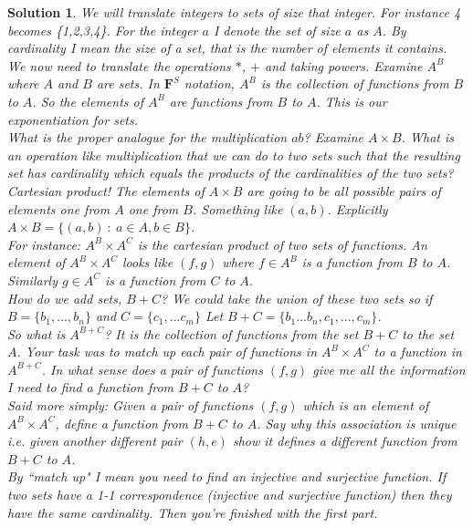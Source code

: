 \documentclass{article}
\theoremstyle{problemstyle}
\theoremstyle{problemstyle}
\newtheorem{solution}{Solution}
\theoremstyle{problemstyle}
\begin{document}
\begin{solution}
We will translate integers to sets of size that integer. For instance 4 becomes \{1,2,3,4\}. For the integer $a$ I denote the set of size $a$ as $A$. By cardinality I mean the size of a set, that is the number of elements it contains. \\ 

We now need to translate the operations $*$, $+$ and taking powers.  Examine $A^B$ where $A$ and $B$ are sets. In $\textbf{F}^S$ notation, $A^B$ is the collection of functions from $B$ to $A$. So the elements of $A^B$ are functions from $B$ to $A$. This is our exponentiation for sets.\\

What is the proper analogue for the multiplication $ab$? Examine $A\times B$. What is an operation like multiplication that we can do to two sets such that the resulting set has cardinality which equals the products of the cardinalities of the  two sets? Cartesian product! The elements of $A\times B$ are going to be all possible pairs of elements one from $A$ one from $B$. Something like $(a,b)$. Explicitly $A\times B = \{(a,b) \ : \ a \in A, b \in B\}$. \\ 

For instance: $A^B \times A^C$ is the cartesian product of two sets of functions. An element of $A^B \times A^C$ looks like $(f,g)$ where $f \in A^B$ is a function from $B$ to $A$. Similarly $g \in A^C$ is a function from $C$ to $A$.\\ 

How do we add sets, $B + C$? We could take the union of these two sets so if $B = \{b_1,...,b_n\}$ and $C = \{c_1,...c_m\}$ Let $B + C = \{b_1...b_n,c_1,...,c_m\}$.\\ 

So what is $A^{B+C}$? It is the collection of functions from the set $B+C$ to the set $A$. Your task was to match up each pair of functions in $A^B \times A^C$ to a function in $A^{B+C}$. In what sense does a pair of functions $(f,g)$ give me all the information I need to find a function from $B+C$ to $A$?\\ 

Said more simply: Given a pair of functions $(f,g)$ which is an element of $A^B \times A^C$, define a function from $B+C$ to $A$. Say why this association is unique i.e. given another different pair $(h,e)$ show it defines a different function from $B+C$ to $A$.\\ 

By ``match up" I mean you need to find an injective and surjective function. If two sets have a 1-1 correspondence (injective and surjective function) then they have the same cardinality. Then you're finished with the first part.


\end{solution}
\end{document}
